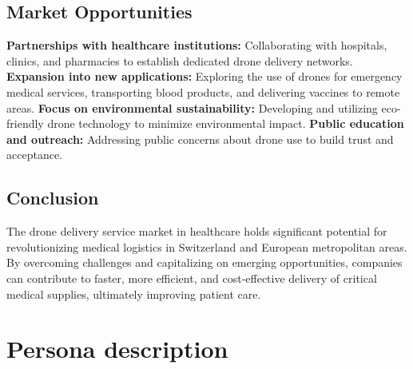 \subsection{Market Opportunities}
\textbf{Partnerships with healthcare institutions:} Collaborating with hospitals, clinics, and pharmacies to establish dedicated drone delivery networks. \cite{fortunebusinessinsights_2023_medical}
\newline
\textbf{Expansion into new applications:} Exploring the use of drones for emergency medical services, transporting blood products, and delivering vaccines to remote areas. \cite{fortunebusinessinsights_2023_medical}
\newline
\textbf{Focus on environmental sustainability:} Developing and utilizing eco-friendly drone technology to minimize environmental impact. \cite{fortunebusinessinsights_2023_medical}
\newline
\textbf{Public education and outreach:} Addressing public concerns about drone use to build trust and acceptance. \cite{fortunebusinessinsights_2023_medical}
\subsection{Conclusion}
The drone delivery service market in healthcare holds significant potential for revolutionizing medical logistics in Switzerland and European metropolitan areas. By overcoming challenges and capitalizing on emerging opportunities, companies can contribute to faster, more efficient, and cost-effective delivery of critical medical supplies, ultimately improving patient care.
\section{Persona description}
